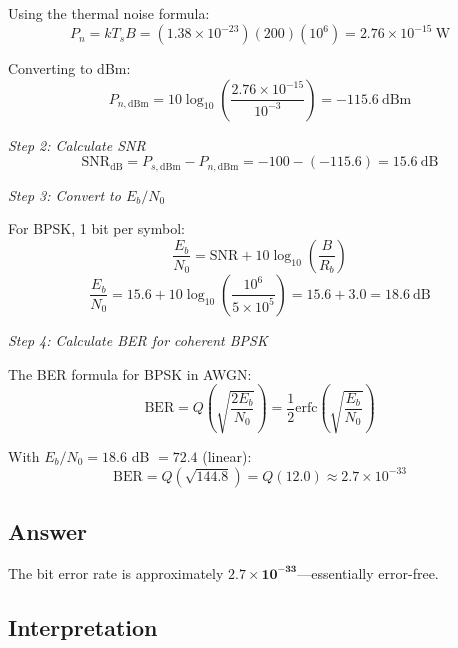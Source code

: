 Using the thermal noise formula:
\begin{equation}
P_n = kT_sB = (1.38 \times 10^{-23})(200)(10^6) = 2.76 \times 10^{-15}\ \text{W}
\end{equation}

Converting to dBm:
\begin{equation}
P_{n,\mathrm{dBm}} = 10\log_{10}\left(\frac{2.76 \times 10^{-15}}{10^{-3}}\right) = -115.6\ \text{dBm}
\end{equation}

\textit{Step 2: Calculate SNR}
\begin{equation}
\mathrm{SNR}_{\mathrm{dB}} = P_{s,\mathrm{dBm}} - P_{n,\mathrm{dBm}} = -100 - (-115.6) = 15.6\ \text{dB}
\end{equation}

\textit{Step 3: Convert to $E_b/N_0$}

For BPSK, 1 bit per symbol:
\begin{equation}
\frac{E_b}{N_0} = \mathrm{SNR} + 10\log_{10}\left(\frac{B}{R_b}\right)
\end{equation}
\begin{equation}
\frac{E_b}{N_0} = 15.6 + 10\log_{10}\left(\frac{10^6}{5 \times 10^5}\right) = 15.6 + 3.0 = 18.6\ \text{dB}
\end{equation}

\textit{Step 4: Calculate BER for coherent BPSK}

The BER formula for BPSK in AWGN:
\begin{equation}
\mathrm{BER} = Q\left(\sqrt{\frac{2E_b}{N_0}}\right) = \frac{1}{2}\mathrm{erfc}\left(\sqrt{\frac{E_b}{N_0}}\right)
\end{equation}

With $E_b/N_0 = 18.6$ dB $= 72.4$ (linear):
\begin{equation}
\mathrm{BER} = Q(\sqrt{144.8}) = Q(12.0) \approx 2.7 \times 10^{-33}
\end{equation}

\subsection*{Answer}

The bit error rate is approximately $\mathbf{2.7 \times 10^{-33}}$---essentially error-free.

\subsection*{Interpretation}

